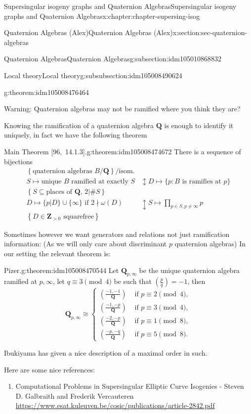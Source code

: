 \documentclass[oneside,10pt,]{book}
\numberwithin{equation}{section}
\newcommand{\legendre}[2]{\left(\frac{#1}{#2}\right)}
\newcommand{\ZZ}{\mathbf{Z}}
\newcommand{\QQ}{\mathbf{Q}}
\newcommand{\gt}{>}
\newcommand{\amp}{&}
\begin{document}
\begin{chapterptx}{Supersingular isogeny graphs and Quaternion Algebras}{}{Supersingular isogeny graphs and Quaternion Algebras}{}{}{x:chapter:chapter-supersing-isog}
\begin{sectionptx}{Quaternion Algebras (Alex)}{}{Quaternion Algebras (Alex)}{}{}{x:section:sec-quaternion-algebras}
\begin{subsectionptx}{Quaternion Algebras}{}{Quaternion Algebras}{}{}{g:subsection:idm105010868832}
\begin{subsubsectionptx}{Local theory}{}{Local theory}{}{}{g:subsubsection:idm105008490624}
\begin{theorem}{}{}{g:theorem:idm105008476464}
\end{theorem}
Warning: Quaternion algebras may not be ramified where you think they are?%
\par
Knowing the ramification of a quaternion algebra \(\QQ\) is enough to identify it uniquely, in fact we have the following theorem%
\begin{theorem}{Main Theorem [96,~14.1.3].}{}{g:theorem:idm105008474672}%
There is a sequence of bijections%
\begin{align*}
\left\{ \text{quaternion algebras }B/\QQ \right\}/\text{isom.}\\
S \mapsto \text{unique }B \text{ ramified at exactly }S\amp\updownarrow D\mapsto \{p : B \text{ is ramifies at } p\}\\
\left\{ S \subseteq \text{places of }\QQ,\,2|\#S \right\}\\
D \mapsto \{p|D\} \cup \{\infty\} \text{ if }2\nmid \omega(D)\amp\updownarrow S \mapsto \prod_{p\in S,p\ne \infty} p\\
\left\{ D\in \ZZ_{\gt 0 }\text{ squarefree}\right\}
\end{align*}
%
\end{theorem}
Sometimes however we want generators and relations not just ramification information: (As we will only care about discriminant \(p\) quaternion algebras) In our setting the relevant theorem is:%
\begin{theorem}{Pizer.}{}{g:theorem:idm105008470544}%
Let \(\QQ_{p,\infty}\) be the unique quaternion algebra ramified at \(p,\infty\), let \(q \equiv 3 \pmod 4\) be such that \(\legendre pq = -1\), then%
\begin{equation*}
\QQ_{p,\infty} \cong
\begin{cases}
\legendre{-1,-1}{\QQ} \amp \text{ if }p\equiv 2\pmod 4,\\
\legendre{-1,-p}{\QQ} \amp \text{ if }p\equiv 3\pmod 4,\\
\legendre{-2,-p}{\QQ} \amp \text{ if }p\equiv 1\pmod 8,\\
\legendre{-p,-q}{\QQ} \amp \text{ if }p\equiv 5\pmod 8.
\end{cases}
\end{equation*}
%
\end{theorem}
Ibukiyama has given a nice description of a maximal order in such.%
\par
Here are some nice references:%
\begin{enumerate}
\item{}Computational Problems in Supersingular Elliptic Curve Isogenies - Steven D. Galbraith and Frederik Vercauteren \url{https://www.esat.kuleuven.be/cosic/publications/article-2842.pdf}%

\end{enumerate}
\end{subsubsectionptx}
\end{subsectionptx}
\end{sectionptx}
\end{chapterptx}
\end{document}
